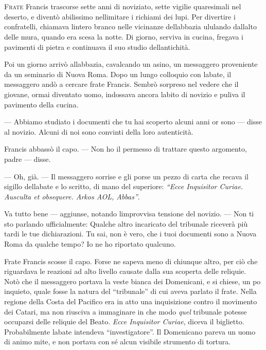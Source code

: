 	\chapter{\phantom{title}}

\lettrine{F}{rate} Francis trascorse sette anni di noviziato, sette vigilie 
quaresimali nel deserto, e diventò abilissimo
nell\textquotesingle imitare i richiami dei lupi. Per divertire i
confratelli, chiamava l\textquotesingle intero branco nelle vicinanze
dell\textquotesingle abbazia ululando dall\textquotesingle alto delle
mura, quando era scesa la notte. Di giorno, serviva in cucina, fregava i
pavimenti di pietra e continuava il suo studio
dell\textquotesingle antichità.

Poi un giorno arrivò all\textquotesingle abbazia, cavalcando un asino,
un messaggero proveniente da un seminario di Nuova Roma. Dopo un lungo
colloquio con l\textquotesingle abate, il messaggero andò a cercare
frate Francis. Sembrò sorpreso nel vedere che il giovane, ormai
diventato uomo, indossava ancora l\textquotesingle abito di novizio e
puliva il pavimento della cucina.

--- Abbiamo studiato i documenti che tu hai scoperto alcuni anni or sono
--- disse al novizio. Alcuni di noi sono convinti della loro
autenticità.

Francis abbassò il capo. --- Non ho il permesso di trattare questo
argomento, padre --- disse.

--- Oh, già. --- Il messaggero sorrise e gli porse un pezzo di carta che
recava il sigillo dell\textquotesingle abate e lo scritto, di mano del
superiore: \emph{``Ecce Inquisitor Curiae. Ausculta et obsequere. Arkos
	AOL, Abbas''}.

Va tutto bene --- aggiunse, notando l\textquotesingle improvvisa
tensione del novizio. --- Non ti sto parlando ufficialmente: Qualche
altro incaricato del tribunale riceverà più tardi le tue dichiarazioni.
Tu sai, non è vero, che i tuoi documenti sono a Nuova Roma da qualche
tempo? Io ne ho riportato qualcuno.

Frate Francis scosse il capo. Forse ne sapeva meno di chiunque altro,
per ciò che riguardava le reazioni ad alto livello causate dalla sua
scoperta delle reliquie. Notò che il messaggero portava la veste bianca
dei Domenicani, e si chiese, un po\textquotesingle{} inquieto, quale
fosse la natura del ``tribunale'' di cui aveva parlato il frate. Nella
regione della Costa del Pacifico era in atto una inquisizione contro il
movimento dei Catari, ma non riusciva a immaginare in che modo
\emph{quel} tribunale potesse occuparsi delle reliquie del Beato.
\emph{Ecce Inquisitor Curiae}, diceva il biglietto. Probabilmente
l\textquotesingle abate intendeva ``investigatore''. Il Domenicano
pareva un uomo di animo mite, e non portava con sé alcun visibile
strumento di tortura.

